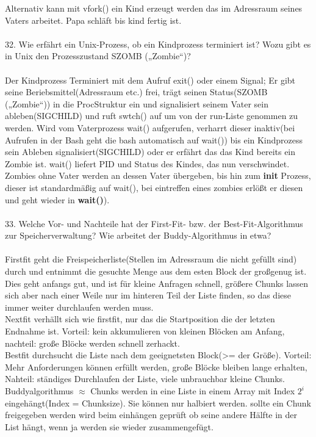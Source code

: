 \documentclass{article}
\begin{document}
Alternativ kann mit vfork() ein Kind erzeugt werden das im Adressraum seines Vaters arbeitet. Papa schl\"aft bis kind fertig ist.
\\
\\
32. Wie erfährt ein Unix-Prozess, ob ein Kindprozess terminiert ist? Wozu gibt es in Unix den
Prozesszustand SZOMB („Zombie“)?
\\
\\
Der Kindprozess Terminiert mit dem Aufruf exit() oder einem Signal;
Er gibt seine Beriebsmittel(Adressraum etc.) frei, tr\"agt seinen Status(SZOMB („Zombie“)) in die ProcStruktur ein und signalisiert seinem Vater sein ableben(SIGCHILD) und ruft swtch() auf um von der run-Liste genommen zu werden.
Wird vom Vaterprozess wait() aufgerufen, verharrt dieser inaktiv(bei Aufrufen in der Bash geht die bash automatisch auf wait()) bis ein Kindprozess sein Ableben signalisiert(SIGCHILD) oder er erf\"ahrt das das Kind bereits ein Zombie ist. wait() liefert PID und Status des Kindes, das nun verschwindet.\\
Zombies ohne Vater werden an dessen Vater \"ubergeben, bis hin zum \textbf{init} Prozess, dieser ist standardm\"a\ss ig auf wait(), bei eintreffen eines zombies erl\"o\ss t er diesen und geht wieder in \textbf{wait()}).
\\
\\
33. Welche Vor- und Nachteile hat der First-Fit- bzw. der Best-Fit-Algorithmus zur Speicherverwaltung? Wie arbeitet der Buddy-Algorithmus in etwa?
\\
\\
Firstfit geht die Freispeicherliste(Stellen im Adressraum die nicht gef\"ullt sind) durch und entnimmt die gesuchte Menge aus dem esten Block der gro\ss genug ist. Dies geht anfangs gut, und ist f\"ur kleine Anfragen schnell, gr\"o\ss ere Chunks lassen sich aber nach einer Weile nur im hinteren Teil der Liste finden, so das diese immer weiter durchlaufen werden muss.\\
Nextfit verh\"allt sich wie firstfit, nur das die Startposition die der letzten Endnahme ist. Vorteil: kein akkumulieren von kleinen Bl\"ocken am Anfang, nachteil: gro\ss e Bl\"ocke werden schnell zerhackt.\\
Bestfit durchsucht die Liste nach dem geeignetsten Block(>= der Gr\"o\ss e). Vorteil: Mehr Anforderungen k\"onnen erf\"ullt werden, gro\ss e Bl\"ocke bleiben lange erhalten, Nahteil: st\"andiges Durchlaufen der Liste, viele unbrauchbar kleine Chunks.
Buddyalgorithmus $\approx$ Chunks werden in eine Liste in einem Array mit Index $2^i$ eingeh\"angt(Index = Chunksize). Sie k\"onnen nur halbiert werden. sollte ein Chunk freigegeben werden wird beim einh\"angen gepr\"uft ob seine andere H\"alfte in der List h\"angt, wenn ja werden sie wieder zusammengef\"ugt.
\end{document}
